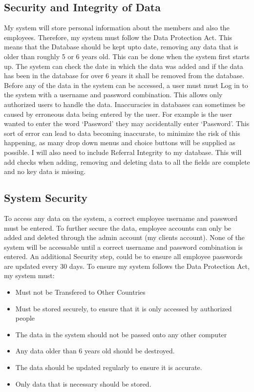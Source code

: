\begin{python}
\subsection{Security and Integrity of Data}

My system will store personal information about the members and also the employees. Therefore, my system must follow the Data Protection Act. This means that the Database should be kept upto date, removing any data that is older than roughly 5 or 6 years old. This can be done when the system first starts up. The system can check the date in which the data was added and if the data has been in the database for over 6 years it shall be removed from the database. Before any of the data in the system can be accessed, a user must must Log in to the system with a username and password combination. This allows only authorized users to handle the data. Inaccuracies in databases can sometimes be caused by erroneous data being entered by the user. For example is the user wanted to enter the word `Password' they may accidentally enter `Password'. This sort of error can lead to data becoming inaccurate, to minimize the risk of this happening, as many drop down menus and choice buttons will be supplied as possible. I will also need to include Referral Integrity to my database. This will add checks when adding, removing and deleting data to all the fields are complete and no key data is missing.

\subsection{System Security}
To access any data on the system, a correct employee username and password must be entered. To further secure the data, employee accounts can only be added and deleted through the admin account (my clients account). None of the system will be accessable until a correct username and password combination is entered. An additional Security step, could be to ensure all employee passwords are updated every 30 days. To ensure my system follows the Data Protection Act, my system must: \par \par
\begin{itemize}
\item Must not be Transfered to Other Countries
\item Must be stored securely, to ensure that it is only accessed by authorized people
\item The data in the system should not be passed onto any other computer
\item Any data older than 6 years old should be destroyed.
\item The data should be updated regularly to ensure it is accurate.
\item Only data that is necessary should be stored.
\end{itemize}

\end{python}
